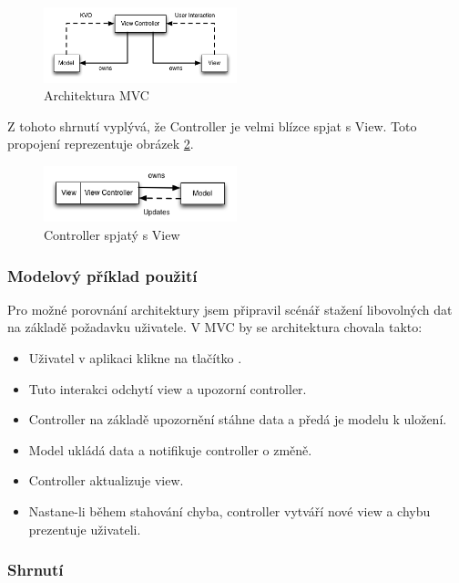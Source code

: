 \begin{figure}\centering
	\includegraphics[width=0.5\textwidth]{assets/mvc-architecture.png}
	\caption[Architektura MVC]{Architektura MVC}\label{fig:architektura-mvc}
\end{figure}

Z tohoto shrnutí vyplývá, že Controller je velmi blízce spjat s View. Toto propojení reprezentuje obrázek \ref{fig:massive-mvc}.

\begin{figure}\centering
	\includegraphics[width=0.5\textwidth]{assets/mvc-massive-view-controller.png}
	\caption[Role Controlleru v MVC]{Controller spjatý s View}\label{fig:massive-mvc}
\end{figure}

\subsubsection{Modelový příklad použití}

Pro možné porovnání architektury jsem připravil scénář stažení libovolných dat na základě požadavku uživatele.
V MVC by se architektura chovala takto:

\begin{itemize}
  \item Uživatel v aplikaci klikne na tlačítko .
  \item Tuto interakci odchytí view a upozorní controller.
  \item Controller na základě upozornění stáhne data a předá je modelu k uložení.
  \item Model ukládá data a notifikuje controller o změně.
  \item Controller aktualizuje view.
  \item Nastane-li během stahování chyba, controller vytváří nové view a chybu prezentuje uživateli.
\end{itemize}

\subsubsection{Shrnutí}

